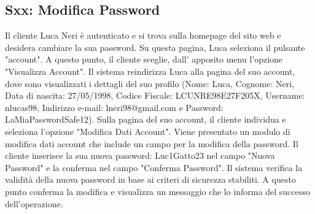 \documentclass[12pt, a4paper, oneside]{book}
\begin{document}
    \subsection*{Sxx: Modifica Password}
        Il cliente Luca Neri è autenticato e si trova sulla homepage del sito web e desidera cambiare la sua password.
        Su questa pagina, Luca seleziona il pulsante "account".
        A questo punto, il cliente sceglie,  dall' apposito menu l'opzione "Visualizza Account".
        Il sistema reindirizza Luca alla pagina del suo account, dove sono visualizzati i dettagli del suo profilo
        (Nome: Luca, Cognome: Neri, Data di nascita: 27/05/1998, Codice Fiscale: LCUNRE98E27F205X, Username: nlucas98,
         Indirizzo e-mail: lneri98@gmail.com e Password:  LaMiaPasswordSafe12).
        Sulla pagina del suo account, il cliente individua e seleziona l'opzione "Modifica Dati Account".
        Viene presentato un modulo di modifica dati account che include un campo per la modifica della password.
        Il cliente inserisce la sua nuova password: Luc1Gatto23 nel campo "Nuova Password" e la conferma nel campo "Conferma Password".
        Il sistema verifica la validità della nuova password in base ai criteri di sicurezza stabiliti.
        A questo punto conferma la modifica e visualizza un messaggio che lo informa del successo dell'operazione.
\end{document}
